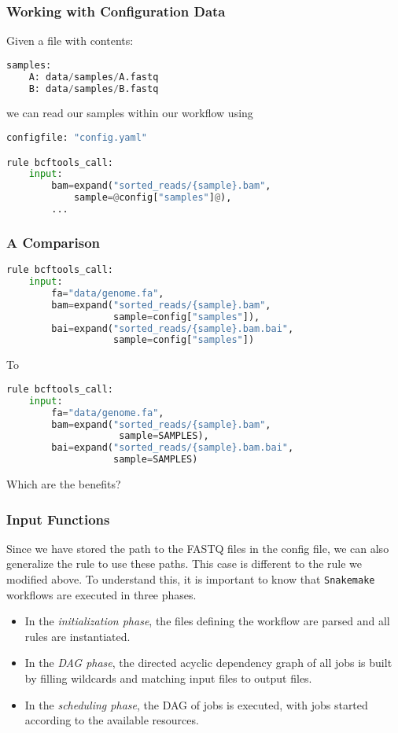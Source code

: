 \begin{frame}[fragile]
  \frametitle{Working with Configuration Data}
  \pause
  Given a file  with contents:
  \begin{lstlisting}[language=Python,style=Python]
samples:
    A: data/samples/A.fastq
    B: data/samples/B.fastq
  \end{lstlisting}
  we can read our samples within our workflow using
  \begin{lstlisting}[language=Python,style=Python]
configfile: "config.yaml"

rule bcftools_call:
    input:
        bam=expand("sorted_reads/{sample}.bam", 
            sample=@config["samples"]@),
        ...
  \end{lstlisting}
\end{frame}

\begin{frame}[fragile]
  \frametitle{A Comparison}
  \begin{lstlisting}[language=Python,style=Python,basicstyle=\footnotesize]
rule bcftools_call:
    input:
        fa="data/genome.fa",
        bam=expand("sorted_reads/{sample}.bam",
                   sample=config["samples"]),
        bai=expand("sorted_reads/{sample}.bam.bai",
                   sample=config["samples"])
  \end{lstlisting}
  To
  \begin{lstlisting}[language=Python,style=Python,basicstyle=\footnotesize]
rule bcftools_call:
    input:
        fa="data/genome.fa",
        bam=expand("sorted_reads/{sample}.bam",
                    sample=SAMPLES),
        bai=expand("sorted_reads/{sample}.bam.bai",
                   sample=SAMPLES)
  \end{lstlisting}
  \bcquestion Which are the benefits?
\end{frame}

\begin{frame}[fragile]
  \frametitle{Input Functions}
  Since we have stored the path to the FASTQ files in the config file, we can also generalize the rule  to use these paths. This case is different to the rule  we modified above. To understand this, it is important to know that \texttt{Snakemake} workflows are executed in three phases.
  \begin{itemize}[<+->]
   \item In the \emph{initialization phase}, the files defining the workflow are parsed and all rules are instantiated.
   \item In the \emph{DAG phase}, the directed acyclic dependency graph of all jobs is built by filling wildcards and matching input files to output files.
   \item In the \emph{scheduling phase}, the DAG of jobs is executed, with jobs started according to the available resources.
  \end{itemize}
\end{frame}

